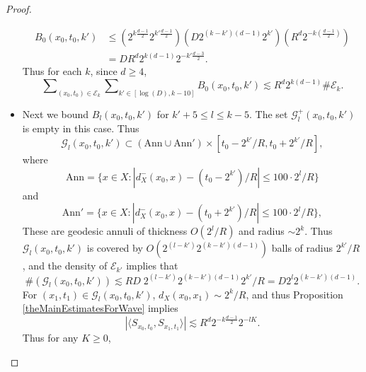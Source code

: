 \begin{proof}
\begin{itemize}
    \begin{align*}
        B_0(x_0,t_0,k') &\leq (2^{k \frac{d-1}{2}} 2^{k' \frac{d-1}{2}}) ( D 2^{(k-k')(d-1)} 2^{k'} )  ( R^d 2^{-k \left( \frac{d-1}{2} \right)} )\\
        &= D R^d 2^{k(d-1)} 2^{-k' \frac{d-3}{2}}.
    \end{align*}
    Thus for each $k$, since $d \geq 4$,
    \begin{equation} \label{AAAlowbounds}
        \sum\nolimits_{(x_0,t_0) \in \mathcal{E}_k} \sum\nolimits_{k' \in [\log(D), k - 10]} B_0(x_0,t_0,k') \lesssim R^{d} 2^{k (d-1)} \# \mathcal{E}_k.
    \end{equation}

    \item Next we bound $B_l(x_0,t_0,k')$ for $k' + 5 \leq l \leq k - 5$. The set $\mathcal{G}_l^+(x_0,t_0,k')$ is empty in this case. Thus
    \begin{equation}
        \mathcal{G}_l(x_0,t_0,k') \subset ( \text{Ann} \cup \text{Ann}' ) \times [t_0 - 2^{k'} / R, t_0 + 2^{k'} / R],
    \end{equation}
    where
    \begin{equation}
        \text{Ann} = \{ x \in X: |d_X^-(x_0,x) - (t_0 - 2^{k'}) / R| \leq 100 \cdot 2^l / R \}
    \end{equation}
    and
    \begin{equation}
        \text{Ann}' = \{ x \in X: |d_X^-(x_0,x) - (t_0 + 2^{k'}) / R| \leq 100 \cdot 2^l / R \},
    \end{equation}
    These are geodesic annuli of thickness $O(2^l / R)$ and radius $\sim 2^k$. Thus $\mathcal{G}_l(x_0,t_0,k')$ is covered by $O( 2^{(l-k')} 2^{(k-k')(d-1)} )$ balls of radius $2^{k'} / R$, and the density of $\mathcal{E}_{k'}$ implies that
    \begin{equation}
        \#(\mathcal{G}_l(x_0,t_0,k')) \lesssim R D\; 2^{(l-k')} 2^{(k-k')(d-1)} 2^{k'} / R = D 2^{l} 2^{(k-k')(d-1)}.
    \end{equation}
    For $(x_1,t_1) \in \mathcal{G}_l(x_0,t_0,k')$, $d_X(x_0,x_1) \sim 2^k / R$, and thus Proposition \ref{theMainEstimatesForWave} implies
    \begin{equation}
        |\langle {S\!}_{x_0,t_0}, {S\!}_{x_1,t_1} \rangle| \lesssim R^d 2^{-k \frac{d-1}{2}} 2^{-lK}.
    \end{equation}
    Thus for any $K \geq 0$,
    \begin{equation}

\end{equation}
\end{itemize}
\end{proof}
